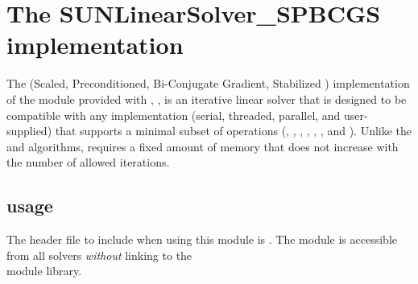 \section{The SUNLinearSolver\_SPBCGS implementation}\label{ss:sunlinsol_spbcgs}

The {\spbcg} (Scaled, Preconditioned, Bi-Conjugate Gradient,
Stabilized \cite{Van:92}) implementation of the {\sunlinsol} module
provided with {\sundials}, {\sunlinsolspbcgs}, is an iterative linear
solver that is designed to be compatible with any {\nvector}
implementation (serial, threaded, parallel, and user-supplied) that
supports a minimal subset of operations (,
, , , ,
, and ).  Unlike the {\spgmr} and {\spfgmr}
algorithms, {\spbcg} requires a fixed amount of memory that does not
increase with the number of allowed iterations.

\subsection{{\sunlinsolspbcgs} usage}\label{ss:sunlinsol_spbcgs_usage}

The header file to include when using this module
is . The {\sunlinsolspbcgs} module
is accessible from all {\sundials} solvers \textit{without}
linking to the \\ \noindent
{} module library.


